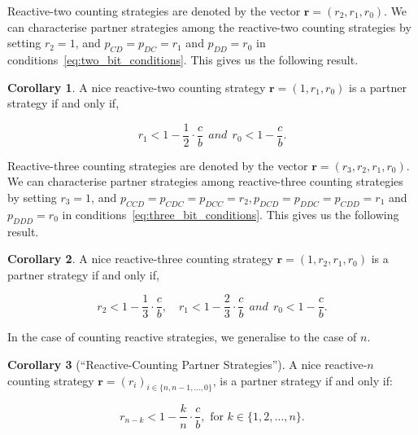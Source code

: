 \documentclass{article}
\theoremstyle{definition}
\newtheorem{corollary}{Corollary}[theorem]
\begin{document}
Reactive-two counting strategies are denoted by the vector $\mathbf{r}=(r_2,
r_1, r_0)$. We can characterise partner strategies among the reactive-two
counting strategies by setting $r_2 = 1$, and $p_{CD} = p_{DC} = r_1$ and
$p_{DD} = r_0$ in conditions~\eqref{eq:two_bit_conditions}. This gives us the
following result.

\begin{corollary}
A nice reactive-two counting strategy $\mathbf{r} = (1, r_1, r_0)$ is a partner strategy if and only if,

\begin{equation}\label{eq:counting_two_bit_conditions}
  \displaystyle r_1 < 1-\frac{1}{2} \cdot \frac{c}{b} ~~and~~ r_0 < 1\!-\! \frac{c}{b}.
\end{equation}
\end{corollary}

Reactive-three counting strategies are denoted by the vector $\mathbf{r}=(r_3,
r_2, r_1, r_0)$. We can characterise partner strategies among reactive-three
counting strategies by setting $r_3 = 1$, and $p_{CCD} = p_{CDC} = p_{DCC} =
r_2, p_{DCD} = p_{DDC} = p_{CDD} = r_1$ and $p_{DDD} = r_0$ in
conditions~\eqref{eq:three_bit_conditions}. This gives us the following result.

\begin{corollary}
A nice reactive-three counting strategy $\mathbf{r} = (1, r_2, r_1, r_0)$ is a partner strategy if and only if,

\begin{equation}\label{eq:counting_three_bit_conditions}
  \displaystyle r_2 < 1- \frac{1}{3} \cdot \frac{c}{b}, \quad r_1 < 1- \frac{2}{3} \cdot \frac{c}{b} ~~and~~ r_0 < 1\!-\! \frac{c}{b}.
\end{equation}
\end{corollary}

In the case of counting reactive strategies, we generalise to the case of $n$.

\begin{corollary}[``Reactive-Counting Partner Strategies'']\label{corollary:reactive_counting_partner_strategies}
A nice reactive-$n$ counting strategy $\mathbf{r}=(r_i)_{i \in \{n, n-1, \dots, 0\}}$,
is a partner strategy if and only if:

\begin{equation}
  r_{n - k} < 1 - \frac{k}{n} \cdot \frac{c}{b}, \text{ for } k \in \{1, 2, \dots, n\}.
\end{equation}

\end{corollary}
\end{document}
